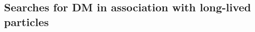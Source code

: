 
\subsection{Searches for DM in association with long-lived particles}
\label{sec:results_LLPSearches}


%
%
%
%
%


%
%
%
%
%



